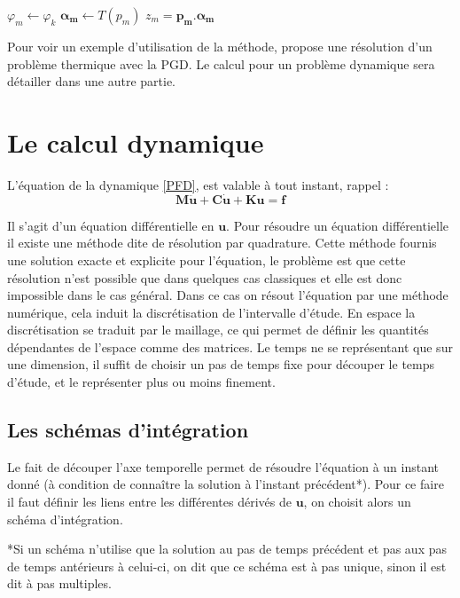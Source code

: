 \documentclass[12pt,a4paper]{report}
\newenvironment{changemargin}[2]{\begin{list}{}{%
\setlength{\topsep}{0pt}%
\setlength{\leftmargin}{0pt}%
\setlength{\rightmargin}{0pt}%
\setlength{\listparindent}{\parindent}%
\setlength{\itemindent}{\parindent}%
\setlength{\parsep}{0pt plus 1pt}%
\addtolength{\leftmargin}{#1}%
\addtolength{\rightmargin}{#2}%
}\item }{\end{list}}
\begin{document}
\begin{changemargin}{2cm}{0cm}
\begin{algorithmic}
\STATE $\varphi_m \leftarrow \varphi_k$
\STATE $\boldsymbol{\alpha}_\mathbf{m} \leftarrow T(p_m)$
\STATE $z_m = \mathbf{p_m} . \boldsymbol{\alpha}_\mathbf{m}$
\end{algorithmic}
\end{changemargin}

Pour voir un exemple d'utilisation de la méthode, \cite{Garanteed} propose une résolution d'un problème thermique avec la PGD. Le calcul pour un problème dynamique sera détailler dans une autre partie.


\chapter{Le calcul dynamique}

\noindent
L'équation de la dynamique \ref{PFD}, est valable à tout instant, rappel :
\[
\mathbf{M}\mathbf{\ddot{u}} + \mathbf{C}\mathbf{\dot{u}} + \mathbf{K}\mathbf{u} =
\mathbf{f}
\]

Il s'agit d'un équation différentielle en $\mathbf{u}$. Pour résoudre un équation différentielle il existe une méthode dite de résolution par quadrature. Cette méthode fournis une solution exacte et explicite pour l'équation, le problème est que cette résolution n'est possible que dans quelques cas classiques et elle est donc impossible dans le cas général. Dans ce cas on résout l'équation par une méthode numérique, cela induit la discrétisation de l'intervalle d'étude. En espace la discrétisation se traduit par le maillage, ce qui permet de définir les quantités dépendantes de l'espace comme des matrices. Le temps ne se représentant que sur une dimension, il suffit de choisir un pas de temps fixe pour découper le temps d'étude, et le représenter plus ou moins finement.

\section{Les schémas d'intégration}
\label{SchemasDIntegration}

Le fait de découper l'axe temporelle permet de résoudre l'équation à un instant donné (à condition de connaître la solution à l'instant précédent*). Pour ce faire il faut définir les liens entre les différentes dérivés de $\mathbf{u}$, on choisit alors un schéma d'intégration.

*Si un schéma n'utilise que la solution au pas de temps précédent et pas aux pas de temps antérieurs à celui-ci, on dit que ce schéma est à pas unique, sinon il est dit à pas multiples.
\end{document}
